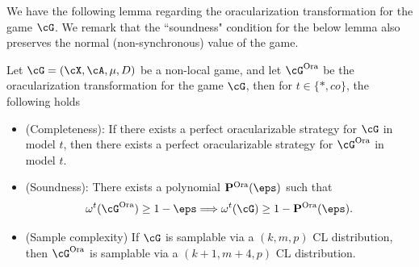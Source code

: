 We have the following lemma regarding the oracularization transformation for the game $\cG$. We remark that the ``soundness" condition for the below lemma also preserves the normal (non-synchronous) value of the game. 


\begin{lemma} \label{lem:oratransformation}
	Let $\cG = (\cX, \cA, \mu, D)$ be a non-local game, and let $\cG^{\text{Ora}}$ be the oracularization transformation for the game $\cG$, then for $t \in \{*, co\}$, the following holds
	\begin{itemize}
		\item (Completeness): If there exists a perfect oracularizable strategy for $\cG$ in model $t$, then there exists a perfect oracularizable strategy for $\cG^{\text{Ora}}$ in model $t$. 
		\item (Soundness): There exists a polynomial $\mathbf{P}^{\text{Ora}} (\eps)$ such that
		\begin{equation*}
			\omega^t(\cG^{\text{Ora}}) \geq 1 - \eps \Longrightarrow \omega^t(\cG) \geq 1 - \mathbf{P}^{\text{Ora}}(\eps). 
		\end{equation*}
		\item (Sample complexity) If $\cG$ is samplable via a $(k,m,p)$ CL distribution, then $\cG^{\text{Ora}}$ is samplable via a $(k+1, m+4,p)$ CL distribution. 
	\end{itemize}
\end{lemma}

